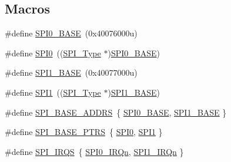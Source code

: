 \subsection*{Macros}
\begin{DoxyCompactItemize}
\item 
\#define \mbox{\hyperlink{group___s_p_i___peripheral___access___layer_gadeaa49ab944c7dcae2a868b0450232c8}{S\+P\+I0\+\_\+\+B\+A\+SE}}~(0x40076000u)
\item 
\#define \mbox{\hyperlink{group___s_p_i___peripheral___access___layer_gaf26e39c91b262cc480085abcc450d3d5}{S\+P\+I0}}~((\mbox{\hyperlink{struct_s_p_i___type}{S\+P\+I\+\_\+\+Type}} $\ast$)\mbox{\hyperlink{group___s_p_i___peripheral___access___layer_gadeaa49ab944c7dcae2a868b0450232c8}{S\+P\+I0\+\_\+\+B\+A\+SE}})
\item 
\#define \mbox{\hyperlink{group___s_p_i___peripheral___access___layer_ga50cd8b47929f18b05efbd0f41253bf8d}{S\+P\+I1\+\_\+\+B\+A\+SE}}~(0x40077000u)
\item 
\#define \mbox{\hyperlink{group___s_p_i___peripheral___access___layer_gad483be344a28ac800be8f03654a9612f}{S\+P\+I1}}~((\mbox{\hyperlink{struct_s_p_i___type}{S\+P\+I\+\_\+\+Type}} $\ast$)\mbox{\hyperlink{group___s_p_i___peripheral___access___layer_ga50cd8b47929f18b05efbd0f41253bf8d}{S\+P\+I1\+\_\+\+B\+A\+SE}})
\item 
\#define \mbox{\hyperlink{group___s_p_i___peripheral___access___layer_gab542f6d657e05e21cc2c9e66ae3ceb41}{S\+P\+I\+\_\+\+B\+A\+S\+E\+\_\+\+A\+D\+D\+RS}}~\{ \mbox{\hyperlink{group___s_p_i___peripheral___access___layer_gadeaa49ab944c7dcae2a868b0450232c8}{S\+P\+I0\+\_\+\+B\+A\+SE}}, \mbox{\hyperlink{group___s_p_i___peripheral___access___layer_ga50cd8b47929f18b05efbd0f41253bf8d}{S\+P\+I1\+\_\+\+B\+A\+SE}} \}
\item 
\#define \mbox{\hyperlink{group___s_p_i___peripheral___access___layer_ga3a16fecfe27c2052ab60e014be3f66f6}{S\+P\+I\+\_\+\+B\+A\+S\+E\+\_\+\+P\+T\+RS}}~\{ \mbox{\hyperlink{group___s_p_i___peripheral___access___layer_gaf26e39c91b262cc480085abcc450d3d5}{S\+P\+I0}}, \mbox{\hyperlink{group___s_p_i___peripheral___access___layer_gad483be344a28ac800be8f03654a9612f}{S\+P\+I1}} \}
\item 
\#define \mbox{\hyperlink{group___s_p_i___peripheral___access___layer_ga30fd955e8b934f6ea091b7476a020d59}{S\+P\+I\+\_\+\+I\+R\+QS}}~\{ \mbox{\hyperlink{group___interrupt__vector__numbers_gga666eb0caeb12ec0e281415592ae89083afa7f89ab9f5d1965ea1599578d01a454}{S\+P\+I0\+\_\+\+I\+R\+Qn}}, \mbox{\hyperlink{group___interrupt__vector__numbers_gga666eb0caeb12ec0e281415592ae89083aacdff1a9c42582ed663214cbe62c1174}{S\+P\+I1\+\_\+\+I\+R\+Qn}} \}
\end{DoxyCompactItemize}


